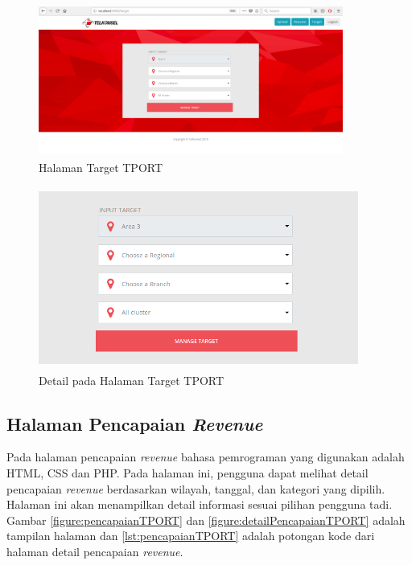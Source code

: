 

\begin{figure}[h!]
	\centerline
	{\includegraphics[width=10cm,height=5cm]{bab5/tampilanTarget.png}}
	\caption{Halaman Target TPORT}
	\label{figure:targetTPORT}
\end{figure}

\begin{figure}[h!]
	\centerline
	{\includegraphics[width=10.5cm,height=6cm]{bab5/detailTampilanTarget.png}}
	\caption{Detail pada Halaman Target TPORT}
	\label{figure:detailTargetTPORT}
\end{figure}

\subsection{Halaman Pencapaian \textit{Revenue}}
Pada halaman pencapaian \textit{revenue} bahasa pemrograman yang digunakan adalah HTML, CSS dan PHP. Pada halaman ini, pengguna dapat melihat detail pencapaian \textit{revenue} berdasarkan wilayah, tanggal, dan kategori yang dipilih. Halaman ini akan menampilkan detail informasi sesuai pilihan pengguna tadi. Gambar \ref{figure:pencapaianTPORT} dan \ref{figure:detailPencapaianTPORT} adalah tampilan halaman dan \ref{lst:pencapaianTPORT} adalah potongan kode dari halaman detail pencapaian \textit{revenue}.

